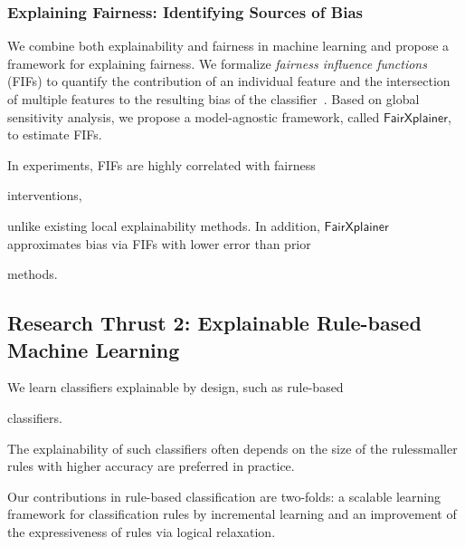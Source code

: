 \documentclass[10pt]{article}
\newif\iflongproposal
\begin{document}
	
	
	\subsubsection*{Explaining Fairness: Identifying Sources of Bias}
	We combine both explainability and fairness in machine learning and propose a framework for explaining fairness.  We formalize \textit{fairness influence functions} (FIFs) to quantify the contribution of an individual feature and the intersection of multiple features to the resulting bias of the classifier~\cite{ghosh2022how}. 	Based on global sensitivity analysis, we propose a model-agnostic framework, called $\mathsf{FairXplainer}$, to estimate FIFs. 
	\iflongproposal
	The key idea is to represent fairness metrics using the variance of predictions and apply variance decomposition to compute FIFs.
	\fi
	In experiments, FIFs are highly correlated with fairness  
	\iflongproposal
	interventions and demonstrate a higher granular explanation of unfairness through intersectional influences,
	\else 
	interventions, 
	\fi
	unlike existing local explainability methods. In addition, $\mathsf{FairXplainer}$ approximates bias via FIFs with lower error than prior 
	\iflongproposal
	methods across classifiers such as neural networks and SVMs.
	\else
	methods.
	\fi
	
	

		
	
	\subsection*{Research Thrust 2: Explainable Rule-based Machine Learning}

	We learn classifiers explainable by design, such as  rule-based 
	\iflongproposal
	classifiers. In rule-based classifiers, for example decision lists and decision sets, the decision boundary is explained using a set of rules relating input features to class prediction.
	\else
	classifiers.
	\fi
	The explainability of such classifiers often depends on the size of the rules\textemdash smaller rules with higher accuracy are preferred in \iflongproposal
	practice, particularly by practitioners in the medical domain.
	\else
	practice.
	\fi 
	Our contributions in rule-based classification are two-folds: a scalable learning  framework for classification rules by incremental learning and an improvement of the expressiveness of rules via logical relaxation.
	
\end{document}
